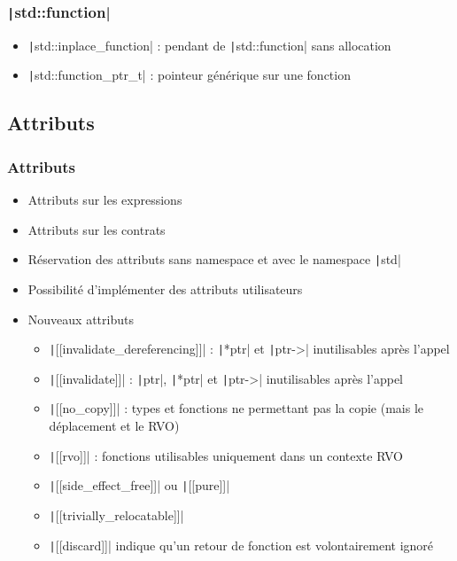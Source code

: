 \documentclass[C++.tex]{subfiles}
\begin{document}
\begin{frame}[fragile]
	\frametitle{\texttt|std::function|}
	\begin{itemize}
		\item \texttt|std::inplace_function| : pendant de \texttt|std::function| sans allocation
		\item \texttt|std::function_ptr_t| : pointeur générique sur une fonction
	\end{itemize}

\end{frame}

\subsection*{Attributs}
\begin{frame}[fragile]
	\frametitle{Attributs}
	\begin{itemize}
		\item Attributs sur les expressions
		\item Attributs sur les contrats
		\item Réservation des attributs sans namespace et avec le namespace \texttt|std|
		\item Possibilité d'implémenter des attributs utilisateurs
		\item Nouveaux attributs
		\begin{itemize}
			\item \texttt|[[invalidate_dereferencing]]| : \texttt|*ptr| et \texttt|ptr->| inutilisables après l'appel


			\item \texttt|[[invalidate]]| : \texttt|ptr|, \texttt|*ptr| et \texttt|ptr->| inutilisables après l'appel


			\item \texttt|[[no_copy]]| : types et fonctions ne permettant pas la copie (mais le déplacement et le RVO)
			\item \texttt|[[rvo]]| : fonctions utilisables uniquement dans un contexte RVO
			\item \texttt|[[side_effect_free]]| ou \texttt|[[pure]]|
			\item \texttt|[[trivially_relocatable]]|
			\item \texttt|[[discard]]| indique qu'un retour de fonction est volontairement ignoré
		\end{itemize}
	\end{itemize}

\end{frame}
\end{document}
